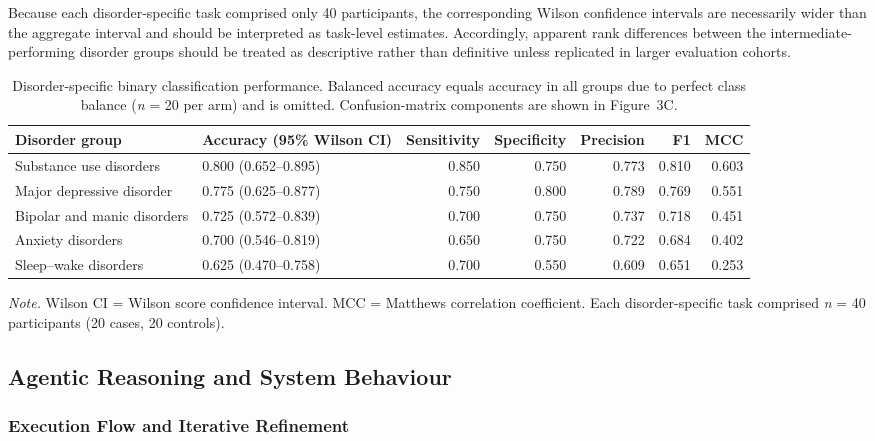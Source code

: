 \documentclass[11pt,a4paper,twoside]{article}
\begin{document}
Because each disorder-specific task comprised only 40 participants, the corresponding Wilson confidence intervals are necessarily wider than the aggregate interval and should be interpreted as task-level estimates. Accordingly, apparent rank differences between the intermediate-performing disorder groups should be treated as descriptive rather than definitive unless replicated in larger evaluation cohorts.
\begin{table}[H]
\caption{Disorder-specific binary classification performance. Balanced accuracy equals accuracy in all groups due to perfect class balance (\textit{n} = 20 per arm) and is omitted. Confusion-matrix components are shown in Figure~3C.}
\label{tab:t3}
\footnotesize
\begin{adjustbox}{max width=\textwidth}
\begin{tabular}{l l r r r r r}
\toprule
Disorder group & Accuracy (95\% Wilson CI) & Sensitivity & Specificity & Precision & F1 & MCC \\
\midrule
Substance use disorders & 0.800 (0.652--0.895) & 0.850 & 0.750 & 0.773 & 0.810 & 0.603 \\
Major depressive disorder & 0.775 (0.625--0.877) & 0.750 & 0.800 & 0.789 & 0.769 & 0.551 \\
Bipolar and manic disorders & 0.725 (0.572--0.839) & 0.700 & 0.750 & 0.737 & 0.718 & 0.451 \\
Anxiety disorders & 0.700 (0.546--0.819) & 0.650 & 0.750 & 0.722 & 0.684 & 0.402 \\
Sleep--wake disorders & 0.625 (0.470--0.758) & 0.700 & 0.550 & 0.609 & 0.651 & 0.253 \\
\bottomrule
\end{tabular}
\end{adjustbox}
\par\smallskip\noindent\small\textit{Note.} Wilson CI = Wilson score confidence interval. MCC = Matthews correlation coefficient. Each disorder-specific task comprised \textit{n} = 40 participants (20 cases, 20 controls).
\end{table}

\subsection{Agentic Reasoning and System Behaviour}

\subsubsection{Execution Flow and Iterative Refinement}
\end{document}
